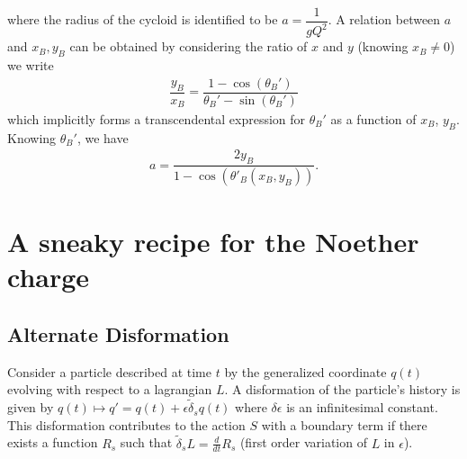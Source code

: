 \documentclass[10pt, a4paper]{article}
\begin{document}
where the radius of the cycloid is identified to be $a = \dfrac{1}{gQ^2}$. A relation between $a$ and $x_B, y_B$ can be obtained by considering the ratio of $x$ and $y$ (knowing $x_B \neq 0$) we write 
\begin{align*}
    \dfrac{y_B}{x_B} = \dfrac{1 - \cos(\theta_B')}{\theta_B'-\sin (\theta_B')}
\end{align*}
which implicitly forms a transcendental expression for $\theta_B'$ as a function of $x_B$, $y_B$. Knowing $\theta_B'$, we have 
\begin{align*}
    a = \dfrac{2y_B}{1 - \cos(\theta'_B(x_B, y_B))}. 
\end{align*}



\newpage

\section{A sneaky recipe for the Noether charge}
%
\subsection{Alternate Disformation}
Consider a particle described at time $t$ by the generalized coordinate $q(t)$ evolving with respect to a lagrangian $L$. A disformation of the particle's history is given by $q(t) \mapsto q' = q(t) +\epsilon \tilde{\delta}_s q(t)$ where $\delta \epsilon$ is an infinitesimal constant. This disformation contributes to the action $S$ with a boundary term if there exists a function $R_s$ such that $\tilde{\delta}_s L = \frac{d}{dt}R_s$ (first order variation of $L$ in $\epsilon$).
\end{document}
